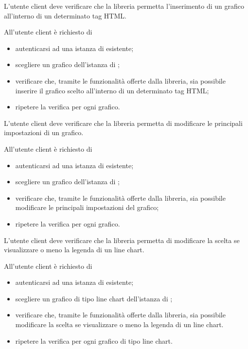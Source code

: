 	L'utente client deve verificare che la libreria permetta l'inserimento di un grafico all'interno di un determinato tag HTML.
		
		All'utente client è richiesto di
		\begin{itemize}
			\item autenticarsi ad una istanza di \projectname{} esistente;
			\item scegliere un grafico dell'istanza di \projectname{};
			\item verificare che, tramite le funzionalità offerte dalla libreria, sia possibile inserire il grafico scelto all'interno di un determinato tag HTML;
			\item ripetere la verifica per ogni grafico.
		\end{itemize}

	L'utente client deve verificare che la libreria permetta di modificare le principali impostazioni di un grafico.
		
		All'utente client è richiesto di
		\begin{itemize}
			\item autenticarsi ad una istanza di \projectname{} esistente;
			\item scegliere un grafico dell'istanza di \projectname{};
			\item verificare che, tramite le funzionalità offerte dalla libreria, sia possibile modificare le principali impostazioni del grafico;
			\item ripetere la verifica per ogni grafico.
		\end{itemize}

	L'utente client deve verificare che la libreria permetta di modificare la scelta se visualizzare o meno la legenda di un line chart.
		
		All'utente client è richiesto di
		\begin{itemize}
			\item autenticarsi ad una istanza di \projectname{} esistente;
			\item scegliere un grafico di tipo line chart dell'istanza di \projectname{};
			\item verificare che, tramite le funzionalità offerte dalla libreria, sia possibile modificare la scelta se visualizzare o meno la legenda di un line chart.
			\item ripetere la verifica per ogni grafico di tipo line chart.
		\end{itemize}

